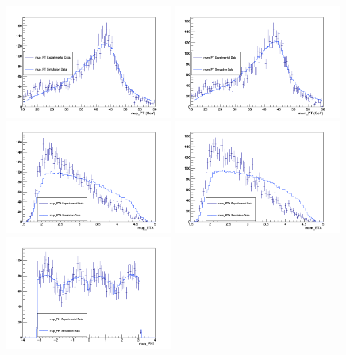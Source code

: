 \documentclass[a4paper]{article}
\begin{document}
\begin{figure}[p]
\centering
\includegraphics[clip, trim = 0.5cm 0cm 1.7cm 1.3cm, width=0.49\textwidth]{Measurement_mup_PT.png}
\includegraphics[clip, trim = 0.5cm 0cm 1.7cm 1.3cm, width=0.49\textwidth]{Measurement_mum_PT.png}
\includegraphics[clip, trim = 0.5cm 0cm 1.7cm 1.3cm, width=0.49\textwidth]{Measurement_mup_ETA.png}
\includegraphics[clip, trim = 0.5cm 0cm 1.7cm 1.3cm, width=0.49\textwidth]{Measurement_mum_ETA.png}
\includegraphics[width=0.49\textwidth]{Measurement_mup_PHI.png}

\end{figure}
\end{document}
